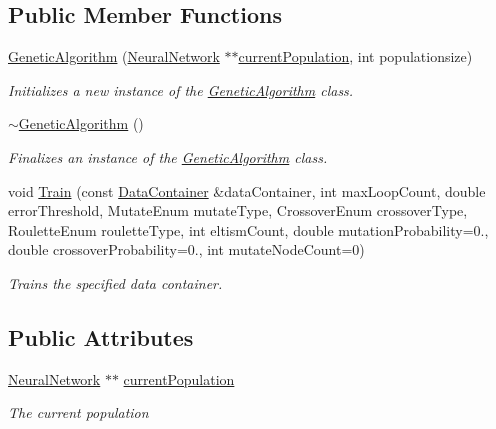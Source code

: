 \subsection*{Public Member Functions}
\begin{DoxyCompactItemize}
\item 
\hyperlink{class_n_n_t_lib_1_1_genetic_algorithm_a19cd4345ff1f8950b830316fbabc95c5}{Genetic\+Algorithm} (\hyperlink{class_n_n_t_lib_1_1_neural_network}{Neural\+Network} $\ast$$\ast$\hyperlink{class_n_n_t_lib_1_1_genetic_algorithm_a0cc66a7ab5e6b5076a9abb701f194989}{current\+Population}, int populationsize)
\begin{DoxyCompactList}\small\item\em Initializes a new instance of the \hyperlink{class_n_n_t_lib_1_1_genetic_algorithm}{Genetic\+Algorithm} class. \end{DoxyCompactList}\item 
\hyperlink{class_n_n_t_lib_1_1_genetic_algorithm_aa2c7534da0fbf65548a372acc20f32e7}{$\sim$\+Genetic\+Algorithm} ()
\begin{DoxyCompactList}\small\item\em Finalizes an instance of the \hyperlink{class_n_n_t_lib_1_1_genetic_algorithm}{Genetic\+Algorithm} class. \end{DoxyCompactList}\item 
void \hyperlink{class_n_n_t_lib_1_1_genetic_algorithm_a98e2476f887049587d905917a898ad5c}{Train} (const \hyperlink{class_n_n_t_lib_1_1_data_container}{Data\+Container} \&data\+Container, int max\+Loop\+Count, double error\+Threshold, Mutate\+Enum mutate\+Type, Crossover\+Enum crossover\+Type, Roulette\+Enum roulette\+Type, int eltism\+Count, double mutation\+Probability=0., double crossover\+Probability=0., int mutate\+Node\+Count=0)
\begin{DoxyCompactList}\small\item\em Trains the specified data container. \end{DoxyCompactList}\end{DoxyCompactItemize}
\subsection*{Public Attributes}
\begin{DoxyCompactItemize}
\item 
\hyperlink{class_n_n_t_lib_1_1_neural_network}{Neural\+Network} $\ast$$\ast$ \hyperlink{class_n_n_t_lib_1_1_genetic_algorithm_a0cc66a7ab5e6b5076a9abb701f194989}{current\+Population}
\begin{DoxyCompactList}\small\item\em The current population \end{DoxyCompactList}\end{DoxyCompactItemize}

